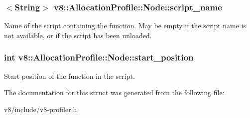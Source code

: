 \subsubsection[{\texorpdfstring{script\+\_\+name}{script_name}}]{$<${\bf String}$>$ v8\+::\+Allocation\+Profile\+::\+Node\+::script\+\_\+name}\hypertarget{structv8_1_1AllocationProfile_1_1Node_acd6567ac06a0bae713390559128e9c62}{}\label{structv8_1_1AllocationProfile_1_1Node_acd6567ac06a0bae713390559128e9c62}
\hyperlink{classv8_1_1Name}{Name} of the script containing the function. May be empty if the script name is not available, or if the script has been unloaded. 
\subsubsection[{\texorpdfstring{start\+\_\+position}{start_position}}]{\setlength{\rightskip}{0pt plus 5cm}int v8\+::\+Allocation\+Profile\+::\+Node\+::start\+\_\+position}\hypertarget{structv8_1_1AllocationProfile_1_1Node_a6caceefbf826a0425adc74331cc7a910}{}\label{structv8_1_1AllocationProfile_1_1Node_a6caceefbf826a0425adc74331cc7a910}
Start position of the function in the script. 

The documentation for this struct was generated from the following file\+:\begin{DoxyCompactItemize}
\item 
v8/include/v8-\/profiler.\+h\end{DoxyCompactItemize}
